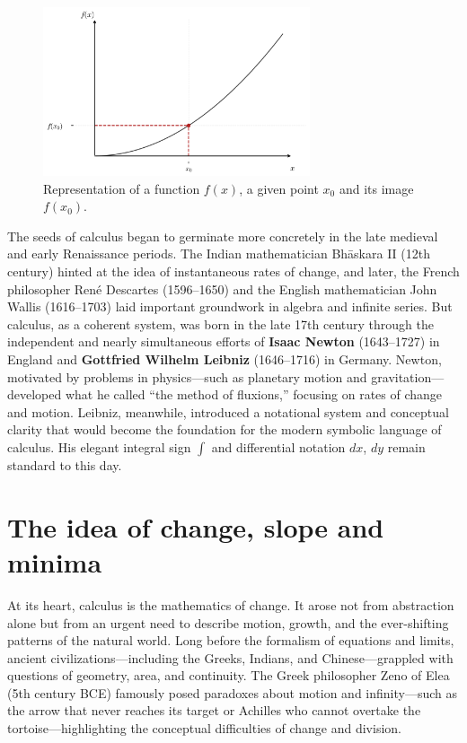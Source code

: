 \documentclass{book}
\begin{document}
\begin{figure}[ht]
    \centering
    \includegraphics[width=0.7\textwidth]{figures/appendix/functions_point_1.png}
    \caption{Representation of a function $f(x)$, a given point $x_0$ and its image $f(x_0)$.}
    \label{fig:functions_point_1}
\end{figure}

The seeds of calculus began to germinate more concretely in the late medieval and early Renaissance periods. The Indian mathematician Bhāskara II (12th century) hinted at the idea of instantaneous rates of change, and later, the French philosopher René Descartes (1596--1650) and the English mathematician John Wallis (1616--1703) laid important groundwork in algebra and infinite series. But calculus, as a coherent system, was born in the late 17th century through the independent and nearly simultaneous efforts of \textbf{Isaac Newton} (1643--1727) in England and \textbf{Gottfried Wilhelm Leibniz} (1646--1716) in Germany. Newton, motivated by problems in physics---such as planetary motion and gravitation---developed what he called ``the method of fluxions,'' focusing on rates of change and motion. Leibniz, meanwhile, introduced a notational system and conceptual clarity that would become the foundation for the modern symbolic language of calculus. His elegant integral sign $\int$ and differential notation $dx$, $dy$ remain standard to this day.\\

\section{The idea of change, slope and minima}

At its heart, calculus is the mathematics of change. It arose not from abstraction alone but from an urgent need to describe motion, growth, and the ever-shifting patterns of the natural world. Long before the formalism of equations and limits, ancient civilizations---including the Greeks, Indians, and Chinese---grappled with questions of geometry, area, and continuity. The Greek philosopher Zeno of Elea (5th century BCE) famously posed paradoxes about motion and infinity---such as the arrow that never reaches its target or Achilles who cannot overtake the tortoise---highlighting the conceptual difficulties of change and division.\\
\end{document}
